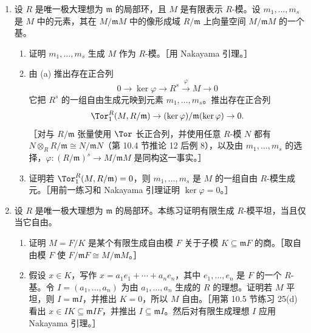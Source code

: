 \begin{enumerate}[label=\arabic*.,resume]
  \item 设 $R$ 是唯一极大理想为 $\mathfrak m$ 的局部环，且 $M$ 是有限表示 $R$-模。设 $m_1,\ldots,m_s$ 是 $M$ 中的元素，其在 $M/\mathfrak mM$ 中的像形成域 $R/\mathfrak m$ 上向量空间 $M/\mathfrak mM$ 的一个基。
  \begin{enumerate}[label=(\alph*)]
    \item 证明 $m_1,\ldots,m_s$ 生成 $M$ 作为 $R$-模。［用 Nakayama 引理。］
    \item 由 (a) 推出存在正合列
    \[
      0\to\ker\varphi\to R^s\xrightarrow{\varphi}M\to0
    \]
    它把 $R^s$ 的一组自由生成元映到元素 $m_1,\ldots,m_s$。推出存在正合列
    \[
      \Tor_1^R(M,R/\mathfrak m)\to(\ker\varphi)/\mathfrak m(\ker\varphi)\to0.
    \]
    ［对与 $R/\mathfrak m$ 张量使用 $\Tor$ 长正合列，并使用任意 $R$-模 $N$ 都有 $N\otimes_R R/\mathfrak m\cong N/\mathfrak mN$（第 10.4 节推论 12 后例 8），以及由 $m_1,
    \ldots,m_s$ 的选择，$\varphi:(R/\mathfrak m)^s\to M/\mathfrak mM$ 是同构这一事实。］
    \item 证明若 $\Tor_1^R(M,R/\mathfrak m)=0$，则 $m_1,
    \ldots,m_s$ 是 $M$ 的一组自由 $R$-模生成元。［用前一练习和 Nakayama 引理证明 $\ker\varphi=0$。］
  \end{enumerate}

  \item 设 $R$ 是唯一极大理想为 $\mathfrak m$ 的局部环。本练习证明有限生成 $R$-模平坦，当且仅当它自由。
  \begin{enumerate}[label=(\alph*)]
    \item 证明 $M=F/K$ 是某个有限生成自由模 $F$ 关于子模 $K\subseteq\mathfrak mF$ 的商。［取自由模 $F$ 使 $F/\mathfrak mF\cong M/\mathfrak mM$。］
    \item 假设 $x\in K$，写作 $x=a_1e_1+\cdots+a_ne_n$，其中 $e_1,
    \ldots,e_n$ 是 $F$ 的一个 $R$-基。令 $I=(a_1,
    \ldots,a_n)$ 为由 $a_1,
    \ldots,a_n$ 生成的 $R$ 的理想。证明若 $M$ 平坦，则 $I=\mathfrak mI$，并推出 $K=0$，所以 $M$ 自由。［用第 10.5 节练习 25(d) 看出 $x\in IK\subseteq\mathfrak mIF$，并推出 $I\subseteq\mathfrak mI$。然后对有限生成理想 $I$ 应用 Nakayama 引理。］
  \end{enumerate}


\end{enumerate}
